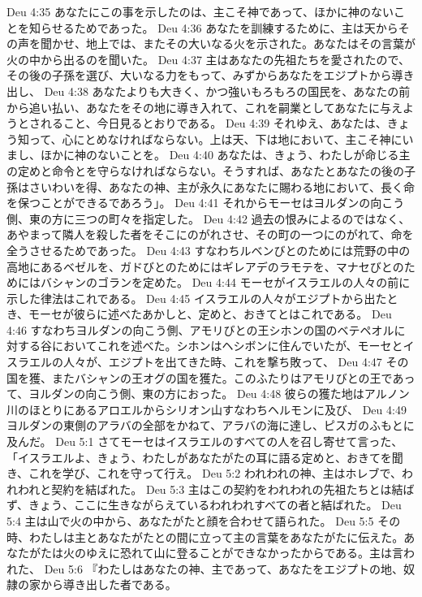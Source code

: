 Deu 4:35  あなたにこの事を示したのは、主こそ神であって、ほかに神のないことを知らせるためであった。
Deu 4:36  あなたを訓練するために、主は天からその声を聞かせ、地上では、またその大いなる火を示された。あなたはその言葉が火の中から出るのを聞いた。
Deu 4:37  主はあなたの先祖たちを愛されたので、その後の子孫を選び、大いなる力をもって、みずからあなたをエジプトから導き出し、
Deu 4:38  あなたよりも大きく、かつ強いもろもろの国民を、あなたの前から追い払い、あなたをその地に導き入れて、これを嗣業としてあなたに与えようとされること、今日見るとおりである。
Deu 4:39  それゆえ、あなたは、きょう知って、心にとめなければならない。上は天、下は地において、主こそ神にいまし、ほかに神のないことを。
Deu 4:40  あなたは、きょう、わたしが命じる主の定めと命令とを守らなければならない。そうすれば、あなたとあなたの後の子孫はさいわいを得、あなたの神、主が永久にあなたに賜わる地において、長く命を保つことができるであろう」。
Deu 4:41  それからモーセはヨルダンの向こう側、東の方に三つの町々を指定した。
Deu 4:42  過去の恨みによるのではなく、あやまって隣人を殺した者をそこにのがれさせ、その町の一つにのがれて、命を全うさせるためであった。
Deu 4:43  すなわちルベンびとのためには荒野の中の高地にあるベゼルを、ガドびとのためにはギレアデのラモテを、マナセびとのためにはバシャンのゴランを定めた。
Deu 4:44  モーセがイスラエルの人々の前に示した律法はこれである。
Deu 4:45  イスラエルの人々がエジプトから出たとき、モーセが彼らに述べたあかしと、定めと、おきてとはこれである。
Deu 4:46  すなわちヨルダンの向こう側、アモリびとの王シホンの国のベテペオルに対する谷においてこれを述べた。シホンはヘシボンに住んでいたが、モーセとイスラエルの人々が、エジプトを出てきた時、これを撃ち敗って、
Deu 4:47  その国を獲、またバシャンの王オグの国を獲た。このふたりはアモリびとの王であって、ヨルダンの向こう側、東の方におった。
Deu 4:48  彼らの獲た地はアルノン川のほとりにあるアロエルからシリオン山すなわちヘルモンに及び、
Deu 4:49  ヨルダンの東側のアラバの全部をかねて、アラバの海に達し、ピスガのふもとに及んだ。
Deu 5:1  さてモーセはイスラエルのすべての人を召し寄せて言った、「イスラエルよ、きょう、わたしがあなたがたの耳に語る定めと、おきてを聞き、これを学び、これを守って行え。
Deu 5:2  われわれの神、主はホレブで、われわれと契約を結ばれた。
Deu 5:3  主はこの契約をわれわれの先祖たちとは結ばず、きょう、ここに生きながらえているわれわれすべての者と結ばれた。
Deu 5:4  主は山で火の中から、あなたがたと顔を合わせて語られた。
Deu 5:5  その時、わたしは主とあなたがたとの間に立って主の言葉をあなたがたに伝えた。あなたがたは火のゆえに恐れて山に登ることができなかったからである。主は言われた、
Deu 5:6  『わたしはあなたの神、主であって、あなたをエジプトの地、奴隷の家から導き出した者である。

